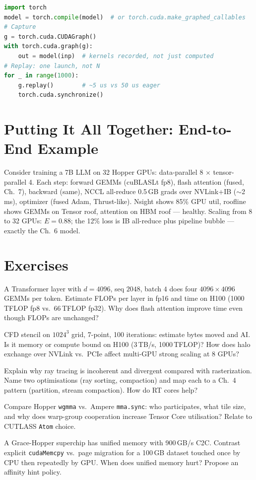 \begin{lstlisting}[language=Python, caption={CUDA Graphs for low-latency inference: capture once, replay cheaply.}]
import torch
model = torch.compile(model)  # or torch.cuda.make_graphed_callables
# Capture
g = torch.cuda.CUDAGraph()
with torch.cuda.graph(g):
    out = model(inp)  # kernels recorded, not just computed
# Replay: one launch, not N
for _ in range(1000):
    g.replay()        # ~5 us vs 50 us eager
    torch.cuda.synchronize()
\end{lstlisting}


\section{Putting It All Together: End-to-End Example}
Consider training a 7B LLM on 32 Hopper GPUs: data-parallel 8 $\times$ tensor-parallel 4. Each step: forward GEMMs (cuBLASLt fp8), flash attention (fused, Ch.~7), backward (same), NCCL all-reduce 0.5\,GB grads over NVLink+IB ($\sim$2\,ms), optimizer (fused Adam, Thrust-like). Nsight shows 85\% GPU util, roofline shows GEMMs on Tensor roof, attention on HBM roof --- healthy. Scaling from 8 to 32 GPUs: $E=0.88$; the 12\% loss is IB all-reduce plus pipeline bubble --- exactly the Ch.~6 model.

\section{Exercises}
\begin{exercise}
A Transformer layer with $d{=}4096$, seq $2048$, batch $4$ does four $4096{\times}4096$ GEMMs per token. Estimate FLOPs per layer in fp16 and time on H100 (1000\,TFLOP fp8 vs.\ 66\,TFLOP fp32). Why does flash attention improve time even though FLOPs are unchanged?
\end{exercise}
\begin{exercise}
CFD stencil on $1024^{3}$ grid, 7-point, 100 iterations: estimate bytes moved and AI. Is it memory or compute bound on H100 (3\,TB/s, 1000\,TFLOP)? How does halo exchange over NVLink vs.\ PCIe affect multi-GPU strong scaling at 8 GPUs?
\end{exercise}
\begin{exercise}
Explain why ray tracing is incoherent and divergent compared with rasterization. Name two optimisations (ray sorting, compaction) and map each to a Ch.~4 pattern (partition, stream compaction). How do RT cores help?
\end{exercise}
\begin{exercise}
Compare Hopper \texttt{wgmma} vs.\ Ampere \texttt{mma.sync}: who participates, what tile size, and why does warp-group cooperation increase Tensor Core utilisation? Relate to CUTLASS \texttt{Atom} choice.
\end{exercise}
\begin{exercise}
A Grace-Hopper superchip has unified memory with 900\,GB/s C2C. Contrast explicit \texttt{cudaMemcpy} vs.\ page migration for a 100\,GB dataset touched once by CPU then repeatedly by GPU. When does unified memory hurt? Propose an affinity hint policy.
\end{exercise}

